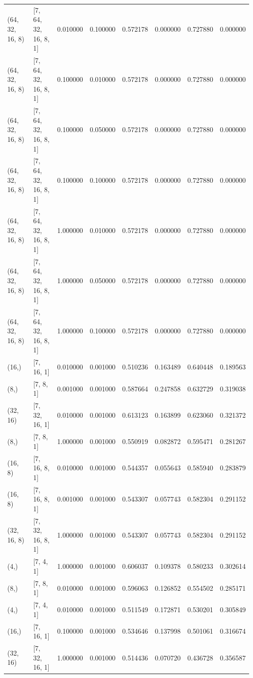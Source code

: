 \documentclass{article}
\begin{document}
\begin{longtable}{llrrrrrr}
(64, 32, 16, 8) & [7, 64, 32, 16, 8, 1] & 0.010000 & 0.100000 & 0.572178 & 0.000000 & 0.727880 & 0.000000 \\
(64, 32, 16, 8) & [7, 64, 32, 16, 8, 1] & 0.100000 & 0.010000 & 0.572178 & 0.000000 & 0.727880 & 0.000000 \\
(64, 32, 16, 8) & [7, 64, 32, 16, 8, 1] & 0.100000 & 0.050000 & 0.572178 & 0.000000 & 0.727880 & 0.000000 \\
(64, 32, 16, 8) & [7, 64, 32, 16, 8, 1] & 0.100000 & 0.100000 & 0.572178 & 0.000000 & 0.727880 & 0.000000 \\
(64, 32, 16, 8) & [7, 64, 32, 16, 8, 1] & 1.000000 & 0.010000 & 0.572178 & 0.000000 & 0.727880 & 0.000000 \\
(64, 32, 16, 8) & [7, 64, 32, 16, 8, 1] & 1.000000 & 0.050000 & 0.572178 & 0.000000 & 0.727880 & 0.000000 \\
(64, 32, 16, 8) & [7, 64, 32, 16, 8, 1] & 1.000000 & 0.100000 & 0.572178 & 0.000000 & 0.727880 & 0.000000 \\
(16,) & [7, 16, 1] & 0.010000 & 0.001000 & 0.510236 & 0.163489 & 0.640448 & 0.189563 \\
(8,) & [7, 8, 1] & 0.001000 & 0.001000 & 0.587664 & 0.247858 & 0.632729 & 0.319038 \\
(32, 16) & [7, 32, 16, 1] & 0.010000 & 0.001000 & 0.613123 & 0.163899 & 0.623060 & 0.321372 \\
(8,) & [7, 8, 1] & 1.000000 & 0.001000 & 0.550919 & 0.082872 & 0.595471 & 0.281267 \\
(16, 8) & [7, 16, 8, 1] & 0.010000 & 0.001000 & 0.544357 & 0.055643 & 0.585940 & 0.283879 \\
(16, 8) & [7, 16, 8, 1] & 0.001000 & 0.001000 & 0.543307 & 0.057743 & 0.582304 & 0.291152 \\
(32, 16, 8) & [7, 32, 16, 8, 1] & 1.000000 & 0.001000 & 0.543307 & 0.057743 & 0.582304 & 0.291152 \\
(4,) & [7, 4, 1] & 1.000000 & 0.001000 & 0.606037 & 0.109378 & 0.580233 & 0.302614 \\
(8,) & [7, 8, 1] & 0.010000 & 0.001000 & 0.596063 & 0.126852 & 0.554502 & 0.285171 \\
(4,) & [7, 4, 1] & 0.010000 & 0.001000 & 0.511549 & 0.172871 & 0.530201 & 0.305849 \\
(16,) & [7, 16, 1] & 0.100000 & 0.001000 & 0.534646 & 0.137998 & 0.501061 & 0.316674 \\
(32, 16) & [7, 32, 16, 1] & 1.000000 & 0.001000 & 0.514436 & 0.070720 & 0.436728 & 0.356587 \\

\end{longtable}
\end{document}
